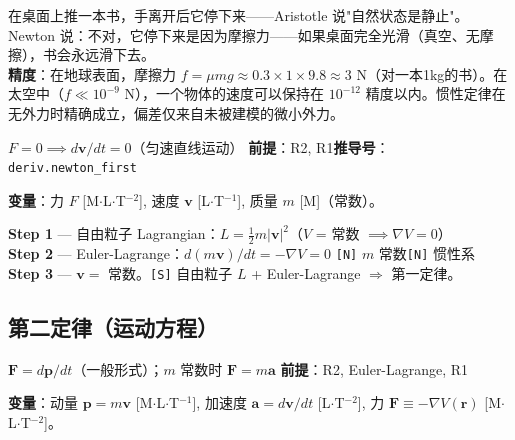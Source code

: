 
\begin{oombox}[日常直觉与物理精确性]
  在桌面上推一本书，手离开后它停下来——Aristotle 说"自然状态是静止"。Newton 说：不对，它停下来是因为摩擦力——如果桌面完全光滑（真空、无摩擦），书会永远滑下去。\\
  \textbf{精度}：在地球表面，摩擦力 $f = \mu mg \approx 0.3 \times 1 \times 9.8 \approx 3$ N（对一本1kg的书）。在太空中（$f \ll 10^{-9}$ N），一个物体的速度可以保持在 $10^{-12}$ 精度以内。惯性定律在无外力时精确成立，偏差仅来自未被建模的微小外力。
\end{oombox}

\begin{lawbox}
  $F = 0 \implies d\mathbf{v}/dt = 0$（匀速直线运动）
  \quad\textbf{前提}：R2, R1\quad\textbf{推导号}：\texttt{deriv.newton\_first}
\end{lawbox}

\noindent\textbf{变量}：力 $F$ [M$\cdot$L$\cdot$T$^{-2}$], 速度 $\mathbf{v}$ [L$\cdot$T$^{-1}$], 质量 $m$ [M]（常数）。

\begin{derivationbox}[推导]
  \textbf{Step 1} — 自由粒子 Lagrangian：$L = \frac{1}{2}m|\mathbf{v}|^2$（$V$ = 常数 $\implies \nabla V = 0$）\\
  \textbf{Step 2} — Euler-Lagrange：$d(m\mathbf{v})/dt = -\nabla V = 0$
  \texttt{[N]} $m$ 常数\quad\texttt{[N]} 惯性系\\
  \textbf{Step 3} — $\mathbf{v} = $ 常数。\quad\texttt{[S]} 自由粒子 $L$ + Euler-Lagrange $\Rightarrow$ 第一定律。
\end{derivationbox}

\subsection{第二定律（运动方程）}

\begin{lawbox}
  $\mathbf{F} = d\mathbf{p}/dt$（一般形式）；$m$ 常数时 $\mathbf{F} = m\mathbf{a}$
  \quad\textbf{前提}：R2, Euler-Lagrange, R1
\end{lawbox}

\noindent\textbf{变量}：动量 $\mathbf{p} = m\mathbf{v}$ [M$\cdot$L$\cdot$T$^{-1}$], 加速度 $\mathbf{a} = d\mathbf{v}/dt$ [L$\cdot$T$^{-2}$],
力 $\mathbf{F} \equiv -\nabla V(\mathbf{r})$ [M$\cdot$L$\cdot$T$^{-2}$]。

